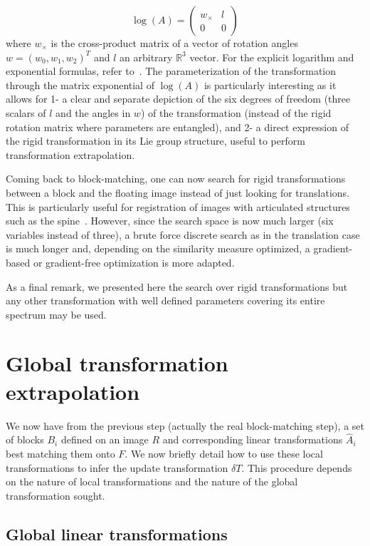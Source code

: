 \documentclass[a4paper]{article}
\begin{document}
\begin{equation}
	\log(A) = \begin{pmatrix} w_{\times} & l \\ 0 & 0 \end{pmatrix}
\end{equation}
where $w_{\times}$ is the cross-product matrix of a vector of rotation angles $w = (w_0,w_1,w_2)^T$ and $l$ an arbitrary $\mathbb{R}^3$ vector. For the explicit logarithm and exponential formulas, refer to~\cite{blanco2010tutorial}. The parameterization of the transformation through the matrix exponential of $\log(A)$ is particularly interesting as it allows for 1- a clear and separate depiction of the six degrees of freedom (three scalars of $l$ and the angles in $w$) of the transformation (instead of the rigid rotation matrix where parameters are entangled), and 2- a direct expression of the rigid transformation in its Lie group structure, useful to perform transformation extrapolation.

Coming back to block-matching, one can now search for rigid transformations between a block and the floating image instead of just looking for translations. This is particularly useful for registration of images with articulated structures such as the spine~\cite{Commowick_Miccai_2012}. However, since the search space is now much larger (six variables instead of three), a brute force discrete search as in the translation case is much longer and, depending on the similarity measure optimized, a gradient-based or gradient-free optimization is more adapted.

As a final remark, we presented here the search over rigid transformations but any other transformation with well defined parameters covering its entire spectrum may be used.

\section{Global transformation extrapolation}

We now have from the previous step (actually the real block-matching step), a set of blocks $B_i$ defined on an image $R$ and corresponding linear transformations $\hat{A}_i$ best matching them onto $F$. We now briefly detail how to use these local transformations to infer the update transformation $\delta T$. This procedure depends on the nature of local transformations and the nature of the global transformation sought.

\subsection{Global linear transformations}
\end{document}
